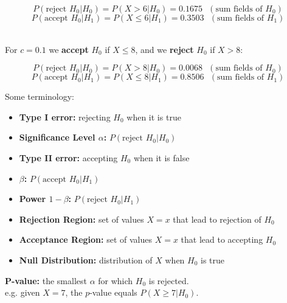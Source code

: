 \documentclass[12pt]{article}
\begin{document}
\[ P(\text{reject } H_0 | H_0) = P(X > 6 | H_0) = 0.1675 \text{ } ( \text{sum fields of } H_0 ) \]
\[ P(\text{accept } H_0 | H_1) = P(X \leq 6 | H_1) = 0.3503 \text{ } ( \text{sum fields of } H_1 ) \]

\noindent
\\
For $c = 0.1$ we \textbf{accept} $H_0$ if $X \leq 8$, and we \textbf{reject} $H_0$ if $X > 8$:

\[ P(\text{reject } H_0 | H_0) = P(X > 8 | H_0) = 0.0068 \text{ } ( \text{sum fields of } H_0 ) \]
\[ P(\text{accept } H_0 | H_1) = P(X \leq 8 | H_1) = 0.8506 \text{ } ( \text{sum fields of } H_1 ) \]

\newpage
\noindent
Some terminology:

\begin{itemize}
    \item \textbf{Type I error:} rejecting $H_0$ when it is true
    \item \textbf{Significance Level $\alpha$:} $P(\text{reject } H_0 | H_0)$
    \item \textbf{Type II error:} accepting $H_0$ when it is false
    \item \textbf{$\beta$:} $P(\text{accept } H_0 | H_1)$
    \item \textbf{Power $1 - \beta$:} $P(\text{reject } H_0 | H_1)$
    \item \textbf{Rejection Region:} set of values $X = x$ that lead to rejection of $H_0$
    \item \textbf{Acceptance Region:} set of values $X = x$ that lead to accepting $H_0$
    \item \textbf{Null Distribution:} distribution of $X$ when $H_0$ is true
\end{itemize}

\noindent
\textbf{P-value:} the smallest $\alpha$ for which $H_0$ is rejected.\\
e.g. given $X = 7$, the $p$-value equals $P(X \geq 7 | H_0)$.
\end{document}
